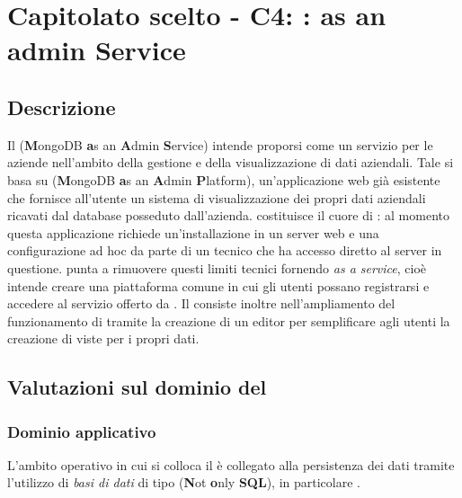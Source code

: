 \section{Capitolato scelto - C4: :  as an admin Service}
\subsection{Descrizione}
Il   (\textbf{M}ongoDB \textbf{a}s an \textbf{A}dmin \textbf{S}ervice) intende proporsi come un servizio per le aziende nell'ambito della gestione e della visualizzazione di dati aziendali. 
Tale  si basa su  (\textbf{M}ongoDB \textbf{a}s an \textbf{A}dmin \textbf{P}latform), un'applicazione web gi\`a esistente  che fornisce all'utente un sistema di visualizzazione
dei propri dati aziendali ricavati dal database  posseduto dall'azienda.
 costituisce il cuore di : al momento questa applicazione richiede un'installazione in un server web e 
una configurazione ad hoc da parte di un tecnico che ha accesso diretto al server in questione.  punta a rimuovere 
questi limiti tecnici fornendo  \textit{as a service}, cioè intende creare una piattaforma comune in cui gli utenti possano 
registrarsi e accedere al servizio offerto da . Il  consiste inoltre nell'ampliamento del funzionamento di  tramite la creazione di 
un editor per semplificare agli utenti la creazione di viste per i propri dati.


\subsection{Valutazioni sul dominio del }
\subsubsection{Dominio applicativo}
L'ambito operativo in cui si colloca il  \`e collegato alla persistenza dei dati tramite l'utilizzo
di \textit{basi di dati} di tipo  (\textbf{N}ot \textbf{o}nly \textbf{SQL}), in particolare .

